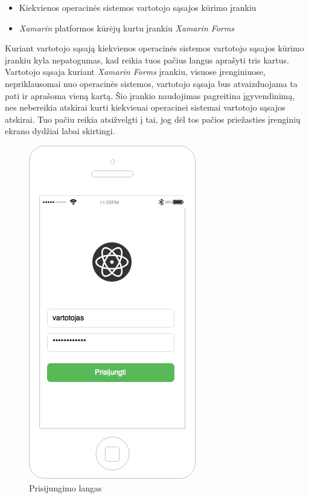 \documentclass{VUMIFPSkursinis}
\begin{document}
\begin{itemize}
	\item Kiekvienos operacinės sistemos vartotojo sąsajos kūrimo įrankiu
	\item \textit{Xamarin} platformos kūrėjų kurtu įrankiu \textit{Xamarin Forms}
\end{itemize}

Kuriant vartotojo sąsają kiekvienos operacinės sistemos vartotojo sąsajos kūrimo įrankiu kyla nepatogumas, kad reikia tuos pačius langus aprašyti tris kartus. Vartotojo sąsaja kuriant \textit{Xamarin Forms} įrankiu, visuose įrenginiuose, nepriklausomai nuo operacinės sistemos, vartotojo sąsaja bus atvaizduojama ta pati ir aprašoma vieną kartą. Šio įrankio naudojimas pagreitina įgyvendinimą, nes nebereikia atskirai kurti kiekvienai operacinei sistemai vartotojo sąsajos atskirai. Tuo pačiu reikia atsižvelgti į tai, jog dėl tos pačios priežasties įrenginių ekrano dydžiai labai skirtingi.

\begin{figure}[H]
	\centering
	\includegraphics[scale=0.5]{img/kursinio_app_login}
	\caption{Prisijungimo langas}
	\label{img:loginView}
\end{figure}
\end{document}
